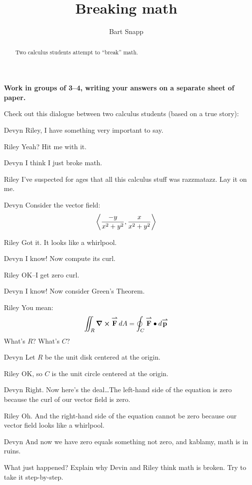 \documentclass[noauthor,nooutcomes]{ximera}
\author{Bart Snapp}
\title[Collaborate:]{Breaking math}
\begin{document}
\begin{abstract}
  Two calculus students attempt to ``break'' math.
\end{abstract}
\maketitle

\textbf{Work in groups of 3--4, writing your answers on a separate
  sheet of paper.}


Check out this dialogue between two calculus students (based on a true
story):

\begin{dialogue}
\item[Devyn] Riley, I have something very important to say.
\item[Riley] Yeah?  Hit me with it.
\item[Devyn] I think I just broke math.
\item[Riley] I've suspected for ages that all this calculus stuff was razzmatazz. Lay it on me.
\item[Devyn] Consider the vector field:
  \[
  \left\langle \frac{-y}{x^2+y^2},\frac{x}{x^2+y^2}\right\rangle
  \]
\item[Riley] Got it. It looks like a whirlpool.
\item[Devyn] I know! Now compute its curl.
\item[Riley] OK--I get zero curl.
\item[Devyn] I know! Now consider Green's Theorem.
\item[Riley] You mean:
  \[
  \iint_R \boldsymbol\nabla\boldsymbol\times {\overset{\boldsymbol{\rightharpoonup}}{\mathbf{F}}} \mathop{}\!d A = \oint_{C} {\overset{\boldsymbol{\rightharpoonup}}{\mathbf{F}}}\bullet\mathop{}\!d{\overset{\boldsymbol{\rightharpoonup}}{\mathbf{p}}}
  \]
  What's $R$? What's $C$?
\item[Devyn] Let $R$ be the unit disk centered at the origin.
\item[Riley] OK, so $C$ is the unit circle centered at the origin.
\item[Devyn] Right. Now here's the deal\dots The left-hand side of the
  equation is zero because the curl of our vector field is zero.
\item[Riley] Oh. And the right-hand side of the equation cannot be
  zero because our vector field looks like a whirlpool.
\item[Devyn] And now we have zero equals something not zero, and kablamy, math is in ruins.
\end{dialogue}


\begin{problem}
  What just happened? Explain why Devin and Riley think math is
  broken. Try to take it step-by-step.
\end{problem}
\end{document}
